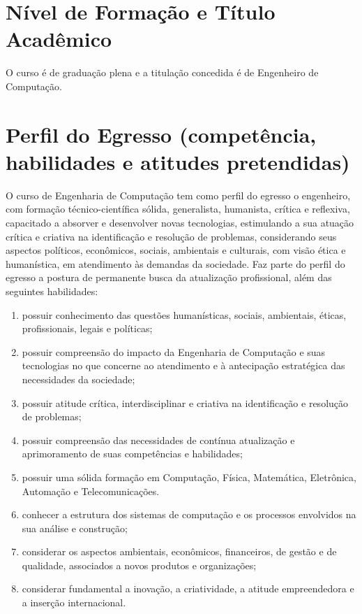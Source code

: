 \section{Nível de Formação e Título Acadêmico}

O curso é de graduação plena e a titulação concedida é de Engenheiro de Computação.

\section{Perfil do Egresso (competência, habilidades e atitudes pretendidas)}

O curso de Engenharia de Computação tem como perfil do egresso o engenheiro, com formação técnico-científica sólida, generalista, humanista, crítica e reflexiva, capacitado a absorver e desenvolver novas tecnologias, estimulando a sua atuação crítica e criativa na identificação e resolução de problemas, considerando seus aspectos políticos, econômicos, sociais, ambientais e culturais, com visão ética e humanística, em atendimento às demandas da sociedade. Faz parte do perfil do egresso a postura de permanente busca da atualização profissional, além das seguintes habilidades:
\begin{enumerate} [I -]
    \item possuir conhecimento das questões humanísticas, sociais, ambientais, éticas, profissionais, legais e políticas;
    \item possuir compreensão do impacto da Engenharia de Computação e suas tecnologias no que concerne ao atendimento e à antecipação estratégica das necessidades da sociedade;
    \item possuir atitude crítica, interdisciplinar e criativa na identificação e resolução de problemas;
    \item possuir compreensão das necessidades de contínua atualização e aprimoramento de suas competências e habilidades;
    \item possuir uma sólida formação em Computação, Física, Matemática, Eletrônica, Automação e Telecomunicações.
    \item conhecer a estrutura dos sistemas de computação e os processos envolvidos na sua análise e construção;
    \item considerar os aspectos ambientais, econômicos, financeiros, de gestão e de qualidade, associados a novos produtos e organizações;
    \item considerar fundamental a inovação, a criatividade, a atitude empreendedora e a inserção internacional.
\end{enumerate}

